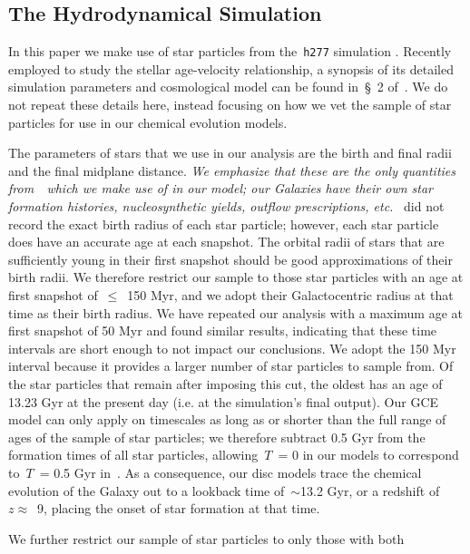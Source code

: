 \documentclass[draft2.tex]{subfiles}
\begin{document}
\subsection{The Hydrodynamical Simulation} 
\label{sec:methods:h277} 
In this paper we make use of star particles from the~\texttt{h277} simulation 
\citep{Christensen2012, Zolotov2012, Loebman2012, Loebman2014, Brooks2014}. 
Recently employed to study the stellar age-velocity relationship, a synopsis of 
its detailed simulation parameters and cosmological model can be found in~\S~2 
of~\citet{Bird2021}. 
We do not repeat these details here, instead focusing on how we vet the sample 
of star particles for use in our chemical evolution models. 
\par 
The parameters of stars that we use in our analysis are the birth and final 
radii and the final midplane distance. 
\textit{
	We emphasize that these are the only quantities from~\hsim~which we make 
	use of in our model; our Galaxies have their own star formation histories, 
	nucleosynthetic yields, outflow prescriptions, etc.
}
\hsim~did not record the exact birth radius of each star particle; however, 
each star particle does have an accurate age at each snapshot. 
The orbital radii of stars that are sufficiently young in their first snapshot 
should be good approximations of their birth radii. 
We therefore restrict our sample to those star particles with an age at first 
snapshot of~$\leq$~150 Myr, and we adopt their Galactocentric radius at that 
time as their birth radius. 
We have repeated our analysis with a maximum age at first snapshot of 50 
Myr and found similar results, indicating that these time intervals are short 
enough to not impact our conclusions. 
We adopt the 150 Myr interval because it provides a larger number of star 
particles to sample from. 
Of the star particles that remain after imposing this cut, the oldest has an 
age of 13.23 Gyr at the present day (i.e. at the simulation's final output). 
Our GCE model can only apply on timescales as long as or shorter than the full 
range of ages of the sample of star particles; we therefore subtract 0.5 Gyr 
from the formation times of all star particles, allowing~$T$~= 0 in our models 
to correspond to~$T$~= 0.5 Gyr in~\hsim. 
As a consequence, our disc models trace the chemical evolution of the Galaxy 
out to a lookback time of~$\sim$13.2 Gyr, or a redshift of~$z \approx$~9, 
placing the onset of star formation at that time. 
\par 
We further restrict our sample of star particles to only those with both 
\end{document}

